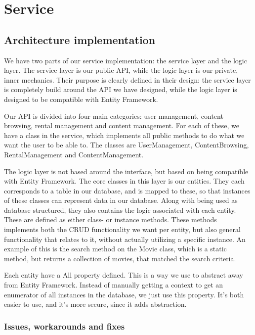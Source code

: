 \section{Service}
\label{Implementation_Service}

\subsection[Architecture]{Architecture implementation}
\label{Implementation_Service_Architecture}
We have two parts of our service implementation: the service layer and the logic layer. The service layer is our public API, while the logic layer is our private, inner mechanics. Their purpose is clearly defined in their design: the service layer is completely build around the API we have designed, while the logic layer is designed to be compatible with Entity Framework. 

Our API is divided into four main categories: user management, content browsing, rental management and content management. For each of these, we have a class in the service, which implements all public methods to do what we want the user to be able to. The classes are UserManagement, ContentBrowsing, RentalManagement and ContentManagement. 

The logic layer is not based around the interface, but based on being compatible with Entity Framework. The core classes in this layer is our entities. They each corresponds to a table in our database, and is mapped to these, so that instances of these classes can represent data in our database. Along with being used as database structured, they also contains the logic associated with each entity. These are defined as either class- or instance methods. These methods implements both the CRUD functionality we want per entity, but also general functionality that relates to it, without actually utilizing a specific instance. An example of this is the search method on the Movie class, which is a static method, but returns a collection of movies, that matched the search criteria. 

Each entity have a All property defined. This is a way we use to abstract away from Entity Framework. Instead of manually getting a context to get an enumerator of all instances in the database, we just use this property. It's both easier to use, and it's more secure, since it adds abstraction. 

\subsubsection{Issues, workarounds and fixes}
\label{Implementation_Service_Architecture_Issues}

